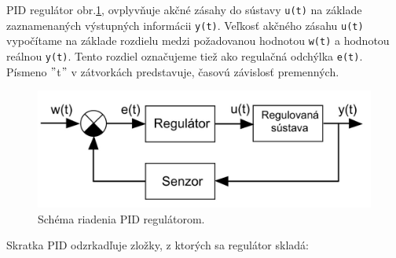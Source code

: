PID regulátor obr.\ref{OBRAZOK 3.3}, ovplyvňuje akčné zásahy do sústavy \verb|u(t)| na základe zaznamenaných výstupných informácii \verb|y(t)|. Veľkosť akčného zásahu \verb|u(t)| vypočítame na základe rozdielu medzi požadovanou hodnotou \verb|w(t)| a hodnotou reálnou \verb|y(t)|. Tento rozdiel označujeme tiež ako regulačná odchýlka \verb|e(t)|. Písmeno $"$t$"$ v zátvorkách predstavuje, časovú závislosť premenných. 

\begin{figure}[!tbh]
	\centering
	\includegraphics[width=120mm]{obr/pid.jpg}
	\caption{Schéma riadenia PID regulátorom.}\label{OBRAZOK 3.3}
\end{figure}

Skratka PID odzrkadľuje zložky, z ktorých sa regulátor skladá: 

